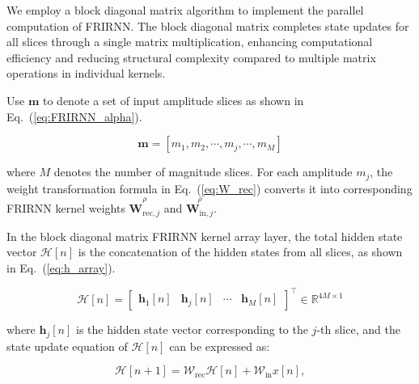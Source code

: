 \documentclass[journal]{IEEEtran}
\newcommand{\magn}{m} %
\newcommand{\midx}{j} %
\newcommand{\mmax}{M} %
\newcommand{\relative}[1]{\overset{\rho}{#1}} %
\newcommand{\Wrecarray}{\mathcal{W}_{\text{rec}}}
\newcommand{\Winarray}{\mathcal{W}_{\text{in}}}
\newcommand{\harray}{\mathcal{H}}
\begin{document}
    
          We employ a block diagonal matrix algorithm to implement the parallel computation of FRIRNN. The block diagonal matrix completes state updates for all slices through a single matrix multiplication, enhancing computational efficiency and reducing structural complexity compared to multiple matrix operations in individual kernels.


    Use $\boldsymbol{\magn}$ to denote a set of input amplitude slices as shown in Eq.~(\ref{eq:FRIRNN_alpha}).

          \begin{equation}
              \boldsymbol{\magn} = [\magn_1, \magn_2, \cdots, \magn_\midx, \cdots, \magn_\mmax]
              \label{eq:FRIRNN_alpha}
          \end{equation}

    
          where $\mmax$ denotes the number of magnitude slices. For each amplitude $\magn_\midx$, the weight transformation formula in Eq.~(\ref{eq:W_rec}) converts it into corresponding FRIRNN kernel weights $\relative{\mathbf{W}_{\text{rec},j}}$ and $\relative{\mathbf{W}_{\text{in},j}}$.



    In the block diagonal matrix FRIRNN kernel array layer, the total hidden state vector $\harray[n]$ is the concatenation of the hidden states from all slices, as shown in Eq.~(\ref{eq:h_array}).

          \begin{equation}
              \harray[n] = \begin{bmatrix}
                  \mathbf{h}_1[n] & \mathbf{h}_\midx[n] & \cdots & \mathbf{h}_\mmax[n] 
              \end{bmatrix}^\top \in \mathbb{R}^{4\mmax \times 1}
              \label{eq:h_array}
          \end{equation}

          
          where $\mathbf{h}_\midx[n]$ is the hidden state vector corresponding to the $j$-th slice, and the state update equation of $\harray[n]$ can be expressed as:


          \begin{equation}
              \harray[n+1] = \Wrecarray \harray[n] + \Winarray x[n],
              \label{eq:h_array_update}
          \end{equation}
\end{document}

